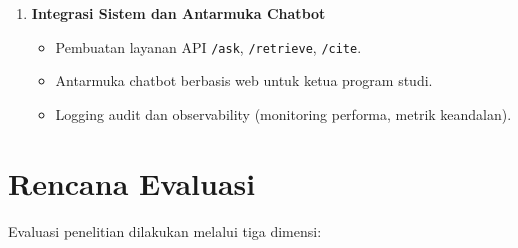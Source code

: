 \documentclass[12pt,a4paper,oneside]{report}
\begin{document}
\begin{enumerate}
            \item \textbf{Integrasi Sistem dan Antarmuka Chatbot}
            \begin{itemize}
                \item Pembuatan layanan API \texttt{/ask}, \texttt{/retrieve}, \texttt{/cite}.
                \item Antarmuka chatbot berbasis web untuk ketua program studi.
                \item Logging audit dan observability (monitoring performa, metrik keandalan).
            \end{itemize}
        \end{enumerate}

        \section{Rencana Evaluasi}
        Evaluasi penelitian dilakukan melalui tiga dimensi:
\end{document}
